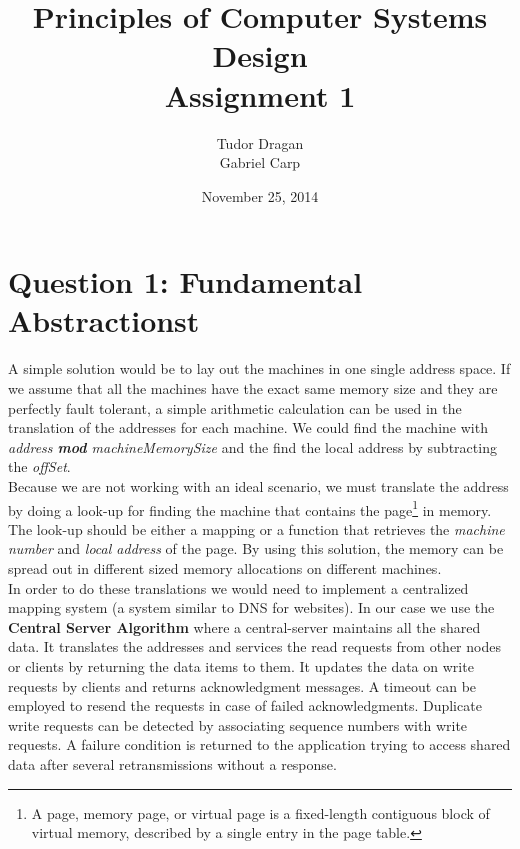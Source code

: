 \documentclass{article}      %
\title{\bf Principles of Computer Systems Design\\ {\Large Assignment 1}}  %
\author{Tudor Dragan\\
Gabriel Carp}      %
\date{November 25, 2014}      %
\begin{document}

\maketitle                   %

\section{Question 1: Fundamental Abstractionst}      %

A simple solution would be to lay out the machines in one single address space. If we assume that all the machines have the exact same memory size and they are perfectly fault tolerant, a simple arithmetic calculation can be used in the translation of the addresses for each machine. We could find the machine with \emph{address {\bf mod} machineMemorySize } and the find the local address by subtracting the \emph{offSet}.\\

Because we are not working with an ideal scenario, we must translate the address by doing a look-up for finding the machine that contains the page\footnote{A page, memory page, or virtual page is a fixed-length contiguous block of virtual memory, described by a single entry in the page table.} in memory. The look-up should be either a mapping or a function that retrieves the \emph{machine number} and \emph{local address} of the page. By using this solution, the memory can be spread out in different sized memory allocations on different machines.\\

In order to do these translations we would need to implement a centralized mapping system (a system similar to DNS for websites). In our case we use the \textbf{Central Server Algorithm} where a central-server maintains all the shared data. It translates the addresses and services the read requests from other nodes or clients by returning the data items to them. It updates the data on write requests by clients and returns acknowledgment messages. A timeout can be employed to resend the requests in case of failed acknowledgments. Duplicate write requests can be detected by associating sequence numbers with write requests. A failure condition is returned to the application trying to access shared data after several retransmissions without a response.\\
\end{document}
